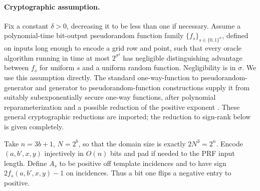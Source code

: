 \documentclass[11pt]{article}
\newcommand{\1}{\mathbf 1}
\begin{document}
\paragraph{Cryptographic assumption.}
Fix a constant $\delta>0$, decreasing it to be less than one if necessary. Assume a polynomial-time bit-output pseudorandom function family $\{f_s\}_{s\in\{0,1\}^\sigma}$, defined on inputs long enough to encode a grid row and point, such that every oracle algorithm running in time at most $2^{\sigma^\delta}$ has negligible distinguishing advantage between $f_s$ for uniform $s$ and a uniform random function. Negligibility is in $\sigma$. We use this assumption directly. The standard one-way-function to pseudorandom-generator and generator to pseudorandom-function constructions supply it from suitably subexponentially secure one-way functions, after polynomial reparameterization and a possible reduction of the positive exponent \citep{HILL99,GGM86}. These general cryptographic reductions are imported; the reduction to sign-rank below is given completely.

Take $n=3b+1$, $N=2^b$, so that the domain size is exactly $2N^3=2^n$. Encode $(a,b',x,y)$ injectively in $O(n)$ bits and pad if needed to the PRF input length. Define $A_s$ to be positive off template incidences and to have sign $2f_s(a,b',x,y)-1$ on incidences. Thus a bit one flips a negative entry to positive.
\end{document}
